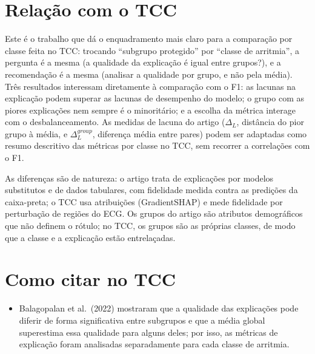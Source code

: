 \documentclass[11pt,a4paper]{article}
\begin{document}
\section{Relação com o TCC}
Este é o trabalho que dá o enquadramento mais claro para a comparação por classe feita no TCC: trocando “subgrupo protegido” por “classe de arritmia”, a pergunta é a mesma (a qualidade da explicação é igual entre grupos?), e a recomendação é a mesma (analisar a qualidade por grupo, e não pela média). Três resultados interessam diretamente à comparação com o F1: as lacunas na explicação podem superar as lacunas de desempenho do modelo; o grupo com as piores explicações nem sempre é o minoritário; e a escolha da métrica interage com o desbalanceamento. As medidas de lacuna do artigo ($\Delta_L$, distância do pior grupo à média, e $\Delta_L^{group}$, diferença média entre pares) podem ser adaptadas como resumo descritivo das métricas por classe no TCC, sem recorrer a correlações com o F1.

As diferenças são de natureza: o artigo trata de explicações por modelos substitutos e de dados tabulares, com fidelidade medida contra as predições da caixa-preta; o TCC usa atribuições (GradientSHAP) e mede fidelidade por perturbação de regiões do ECG. Os grupos do artigo são atributos demográficos que não definem o rótulo; no TCC, os grupos são as próprias classes, de modo que a classe e a explicação estão entrelaçadas.

\section{Como citar no TCC}
\begin{itemize}
  \item Balagopalan et al.\ (2022) mostraram que a qualidade das explicações pode diferir de forma significativa entre subgrupos e que a média global superestima essa qualidade para alguns deles; por isso, as métricas de explicação foram analisadas separadamente para cada classe de arritmia.
\end{itemize}
\end{document}
